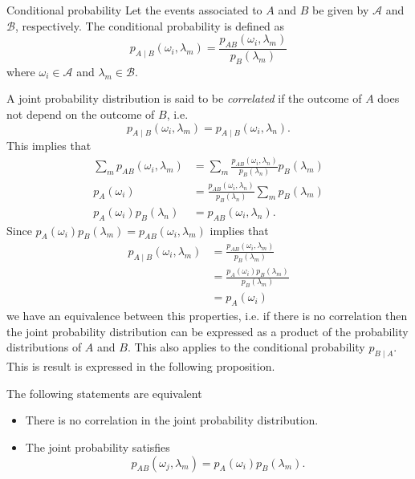 \begin{Definition}{Conditional probability}{}
	Let the events associated to $A$ and $B$ be given by $\mathcal{A}$ and $\mathcal{B}$, respectively. The conditional probability is defined as
	\begin{equation}
		p_{A\mid B}(\omega_i,\lambda_m) = \frac{p_{AB}(\omega_i,\lambda_m)}{p_B(\lambda_m)}
	\end{equation}
	where $\omega_i \in \mathcal{A}$ and $\lambda_m \in \mathcal{B}$.
\end{Definition}
A joint probability distribution is said to be \emph{correlated} if the outcome of $A$ does not depend on the outcome of $B$, i.e.
\begin{equation}
	p_{A\mid B}(\omega_i,\lambda_m) = p_{A\mid B}(\omega_i,\lambda_n).
\end{equation}
This implies that
\begin{equation}
	\begin{aligned}
		\sum_{m}p_{AB}(\omega_i,\lambda_m) & = \sum_{m}\frac{p_{AB}(\omega_i,\lambda_n)}{p_B(\lambda_n)}p_B(\lambda_m) \\
		p_A(\omega_i)                      & = \frac{p_{AB}(\omega_i,\lambda_n)}{p_B(\lambda_n)}\sum_m p_B(\lambda_m)  \\
		p_A(\omega_i) p_B(\lambda_n)       & = p_{AB}(\omega_i,\lambda_n).
	\end{aligned}
\end{equation}
Since $p_{A}(\omega_i)p_B(\lambda_m) = p_{AB}(\omega_i,\lambda_m)$ implies that
\begin{equation}
	\begin{aligned}
		p_{A\mid B}(\omega_i,\lambda_m) & = \frac{p_{AB}(\omega_i,\lambda_m)}{p_B(\lambda_m)}    \\
		                                & = \frac{p_{A}(\omega_i)p_B(\lambda_m)}{p_B(\lambda_m)} \\
		                                & = p_A(\omega_i)
	\end{aligned}
\end{equation}
we have an equivalence between this properties, i.e. if there is no correlation then the joint probability distribution can be expressed as a product of the probability distributions of $A$ and $B$. This also applies to the conditional probability $p_{B\mid A}$. This is result is expressed in the following proposition.
\begin{proposition}
	The following statements are equivalent
	\begin{itemize}
		\item There is no correlation in the joint probability distribution.
		\item The joint probability satisfies
		      \begin{equation*}
			      p_{AB}(\omega_j,\lambda_m) = p_A(\omega_i)p_B(\lambda_m).
		      \end{equation*}
	\end{itemize}
\end{proposition}
